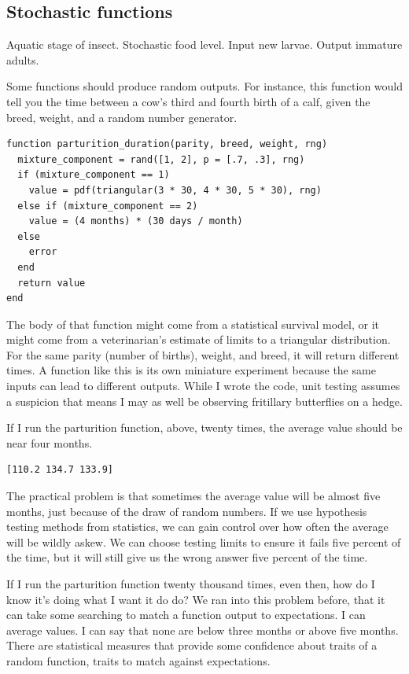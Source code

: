 \documentclass[fleqn,10pt]{olplainarticle}
\begin{document}
\subsection{Stochastic functions}

Aquatic stage of insect. Stochastic food level. Input
new larvae. Output immature adults.

Some functions should produce random outputs. For instance,
this function would tell you the time between a cow's
third and fourth birth of a calf, given the breed, weight,
and a random number generator.
\begin{lstlisting}
function parturition_duration(parity, breed, weight, rng)
  mixture_component = rand([1, 2], p = [.7, .3], rng)
  if (mixture_component == 1)
    value = pdf(triangular(3 * 30, 4 * 30, 5 * 30), rng)
  else if (mixture_component == 2)
    value = (4 months) * (30 days / month)
  else
    error
  end
  return value
end
\end{lstlisting}
The body of that function might come from a statistical
survival model, or it might come from a veterinarian's estimate
of limits to a triangular distribution. For the same parity (number of births), weight,
and breed, it will return different times.
A function like this is its own miniature experiment because the
same inputs can lead to different outputs. While I wrote the
code, unit testing assumes a suspicion that means I may as well
be observing fritillary butterflies on a hedge.

If I run the parturition function, above, twenty times, the
average value should be near four months.
\begin{lstlisting}
[110.2 134.7 133.9]
\end{lstlisting}
The practical problem
is that sometimes the average value will be almost five months,
just because of the draw of random numbers. If we use hypothesis
testing methods from statistics, we can gain control over how
often the average will be wildly askew. We can choose testing
limits to ensure it fails five percent of the time, but it will
still give us the wrong answer five percent of the time.

If I run the parturition function twenty thousand times, even then,
how do I know it's doing what I want it do do? We ran into this
problem before, that it can take some searching to match a
function output to expectations. I can average values. I can
say that none are below three months or above five months.
There are statistical measures that provide some confidence about
traits of a random function, traits to match against expectations.
\end{document}
